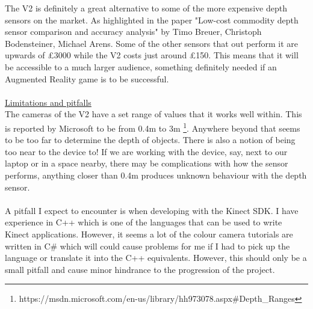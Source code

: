 \documentclass[11pt]{report}
\begin{document}
The V2 is definitely a great alternative to some of the more expensive depth 
sensors on the market. As highlighted in the paper
"Low-cost commodity depth sensor comparison and accuracy analysis" by
Timo Breuer, Christoph Bodensteiner, Michael Arens. Some of the other sensors
that out perform it are upwards of £3000 while the V2 costs just around £150.
This means that it will be accessible to a much larger audience, something
definitely needed if an Augmented Reality game is to be successful.
\\ \\
\underline{Limitations and pitfalls}\\
The cameras of the V2 have a set range of values that it works well within.
This is reported by Microsoft to be from 0.4m to 3m
\footnote{https://msdn.microsoft.com/en-us/library/hh973078.aspx\#Depth\_Ranges}.
Anywhere beyond that seems to be too
far to determine the depth of objects. There is also a notion of being too near
to the device to! If we are working with the device, say, next to our laptop or
in a space nearby, there may be complications with how the sensor performs, 
anything closer than 0.4m produces unknown behaviour with the depth sensor.
\\ \\
A pitfall I expect to encounter is when developing with the Kinect SDK. I have
experience in C++ which is one of the languages that can be used to write Kinect 
applications. However, it seems a lot of the colour camera tutorials are written
in C\# which will could cause problems for me if I had to pick up the language 
or translate it into the C++ equivalents. However, this should only be a small
pitfall and cause minor hindrance to the progression of the project.

\newpage
\end{document}
